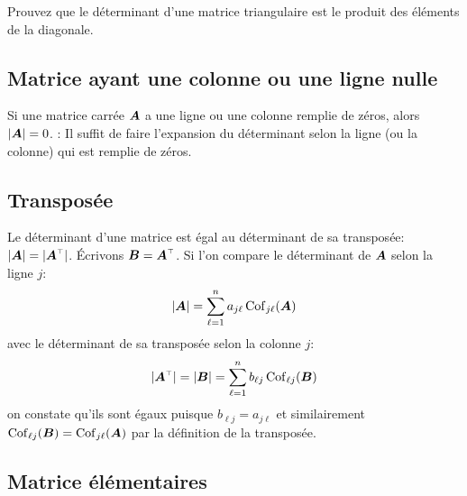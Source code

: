 \begin{exerciceC}
Prouvez que le déterminant d'une matrice triangulaire est le produit des éléments
de la diagonale.
\end{exerciceC}

\subsection{Matrice ayant une colonne ou une ligne nulle}

\begin{theo}
Si une matrice carrée $\boldsymbol{A}$ a une ligne ou une colonne remplie de zéros, alors $|\boldsymbol{A}|=0$.
\proof:
Il suffit de faire l'expansion du déterminant selon la ligne (ou la colonne) qui est remplie de zéros.
\end{theo}

\subsection{Transposée}
\begin{theo}
Le déterminant d'une matrice est égal au déterminant de sa transposée: $|\matA| = |\transp{\matA}|$.
\proof
Écrivons $\matB = \transp{\matA}$. Si l'on compare le déterminant de $\boldsymbol{A}$ selon la ligne $j$:
\[
|\boldsymbol{A}| = \sum_{\ell=1}^n a_{j\ell} \operatorname{Cof}_{j\ell}(\boldsymbol{A})
\]
avec le déterminant de sa transposée selon la colonne $j$:
\[
|\transp{\matA}| =|\matB| = \sum_{\ell=1}^n b_{\ell j} \Cof_{\ell j}(\matB)
\]
on constate qu'ils sont égaux puisque $b_{\ell j} = a_{j \ell}$ et similairement
$\operatorname{Cof}_{\ell j}(\boldsymbol{B}) = \operatorname{Cof}_{j\ell}(\boldsymbol{A})$ par la définition de la transposée.
\end{theo}

\subsection{Matrice élémentaires}

